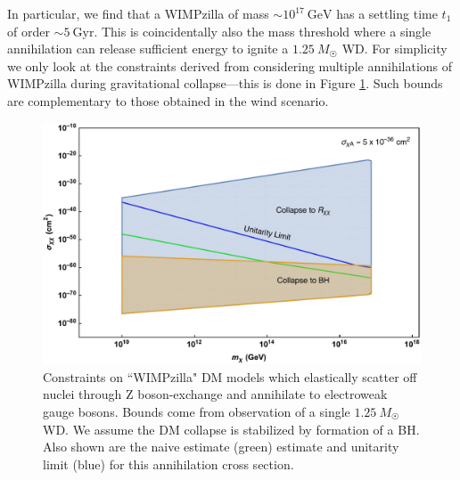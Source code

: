 \documentclass[preprintnumbers,amsmath,amssymb,prd,superscriptaddress]{revtex4}
\newcommand{\GeV}{\text{GeV}}
\begin{document}
In particular, we find that a WIMPzilla of mass $\sim 10^{17} ~\GeV$ has a settling time $t_1$ of order $\sim 5 ~\text{Gyr}$. 
This is coincidentally also the mass threshold where a single annihilation can release sufficient energy to ignite a $1.25~M_{\astrosun}$ WD. 
For simplicity we only look at the constraints derived from considering multiple annihilations of WIMPzilla during gravitational collapse---this is done in Figure \ref{fig:Gutzilla}.
Such bounds are complementary to those obtained in the wind scenario.  
\begin{figure}
\includegraphics[scale=.35]{GZcapture.pdf}
\caption{Constraints on ``WIMPzilla" DM models which elastically scatter off nuclei through Z boson-exchange and annihilate to electroweak gauge bosons. Bounds come from observation of a single $1.25~M_{\astrosun}$ WD.
We assume the DM collapse is stabilized by formation of a BH. Also shown are the naive estimate (green) estimate and unitarity limit (blue) for this annihilation cross section.}
\label{fig:Gutzilla}
\end{figure}
\end{document}

